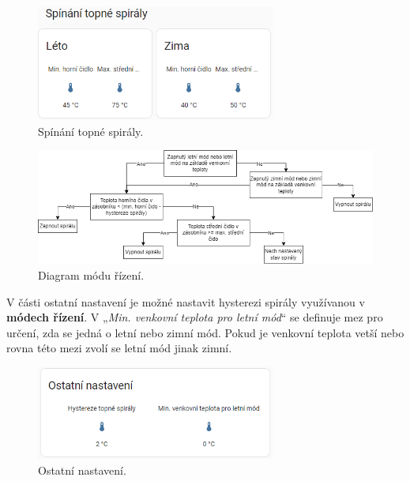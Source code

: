 \begin{Czech}
\begin{figure}[H]
    \centering
    \includegraphics[width=0.7\textwidth]{pictures/czech/software/switching-heating-coil.png}
    \caption{Spínání topné spirály.}
    \label{fig:switching-heating-coil}
\end{figure}
\end{Czech}

\begin{Czech}
\begin{figure}[H]
    \centering
    \includegraphics[width=1\textwidth]{pictures/czech/software/diagram-control-modes.png}
    \caption{Diagram módu řízení.}
    \label{fig:diagram-control-modes}
\end{figure}
\end{Czech}


\begin{Czech}
\end{Czech}

\begin{Czech}
V části ostatní nastavení je možné nastavit hysterezi spirály využívanou v \textbf{módech řízení}. V „\textit{Min. venkovní teplota pro letní mód}“ se definuje mez pro určení, zda se jedná o letní nebo zimní mód. Pokud je venkovní teplota vetší nebo rovna této mezi zvolí se letní mód jinak zimní.
\end{Czech}

\begin{Czech}
\begin{figure}[H]
    \centering
    \includegraphics[width=0.7\textwidth]{pictures/czech/software/other-settings.png}
    \caption{Ostatní nastavení.}
    \label{fig:other-settings}
\end{figure}
\end{Czech}

